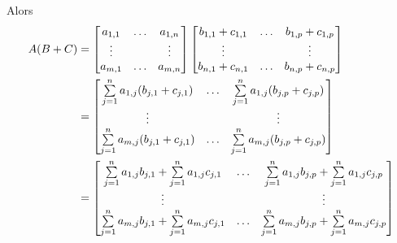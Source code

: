 \documentclass[12pt]{book}
\begin{document}
Alors 
\begin{equation*}
\begin{split}
    A(B+C)& =
    \begin{bmatrix}
    a_{1,1} & \ldots & a_{1,n} \\
    \vdots & & \vdots \\
    a_{m,1} & \ldots & a_{m,n}
    \end{bmatrix}
    \begin{bmatrix}
    b_{1,1} + c_{1,1} & \ldots & b_{1,p} + c_{1,p} \\
    \vdots & & \vdots \\
    b_{n,1} + c_{n,1} & \ldots & b_{n,p}+c_{n,p}
    \end{bmatrix}\\
    & = 
    \begin{bmatrix}
    \sum\limits\limits_{j=1}^na_{1,j}(b_{j,1} + c_{j,1}) & \ldots & \sum\limits_{j=1}^na_{1,j}(b_{j,p} + c_{j,p}) \\
    \vdots & & \vdots \\
    \sum\limits_{j=1}^na_{m,j}(b_{j,1} + c_{j,1}) & \ldots & \sum\limits_{j=1}^na_{m,j}(b_{j,p} + c_{j,p})
    \end{bmatrix}\\
    & =
    \begin{bmatrix}
    \sum\limits_{j=1}^na_{1,j}b_{j,1}+\sum\limits_{j=1}^na_{1,j}c_{j,1}& \ldots & \sum\limits_{j=1}^na_{1,j}b_{j,p}+\sum\limits_{j=1}^na_{1,j}c_{j,p}  \\
    \vdots & & \vdots \\
    \sum\limits_{j=1}^na_{m,j}b_{j,1} + \sum\limits_{j=1}^na_{m,j}c_{j,1} & \ldots & \sum\limits_{j=1}^na_{m,j}b_{j,p}+ \sum\limits_{j=1}^na_{m,j}c_{j,p}
    \end{bmatrix}\\
\end{split}
\end{equation*}
\end{document}
